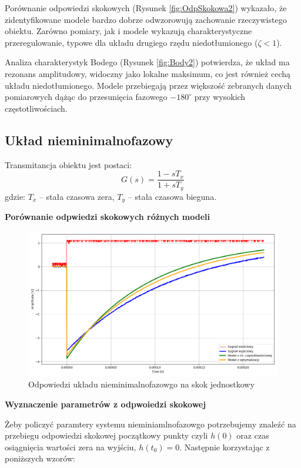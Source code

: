 \documentclass[12pt,a4paper]{article}
\begin{document}
	Porównanie odpowiedzi skokowych (Rysunek \ref{fig:OdpSkokowa2}) wykazało, że zidentyfikowane modele bardzo dobrze odwzorowują zachowanie rzeczywistego obiektu. Zarówno pomiary, jak i modele wykazują charakterystyczne przeregulowanie, typowe dla układu drugiego rzędu niedotłumionego (\(\zeta < 1\)).
	
	Analiza charakterystyk Bodego (Rysunek \ref{fig:Body2}) potwierdza, że układ ma rezonans amplitudowy, widoczny jako lokalne maksimum, co jest również cechą układu niedotłumionego. Modele przebiegają przez większość zebranych danych pomiarowych dążąc do przesunięcia fazowego $-180^\circ$ przy wysokich częstotliwościach.
	
	\subsection{Układ nieminimalnofazowy}
	Transmitancja obiektu jest postaci:
	\begin{equation}
		G(s) = \frac{1-sT_x}{1+sT_y}
	\end{equation}
	gdzie: \(T_x\) – stała czasowa zera, \(T_y\) – stała czasowa bieguna.
	
	\textbf{Porównanie odpwiedzi skokowych różnych modeli}
	
	\begin{figure}[H]
		\centering
		\includegraphics[width=1\linewidth]{zdjecia/odp_skok_nmf.png}
		\caption{Odpowiedzi układu nieminimalnofazowgo na skok jednostkowy}
		\label{fig:skok_uk_nmf}
	\end{figure}
	
	\textbf{Wyznaczenie parametrów z odpwoiedzi skokowej}
	
	Żeby policzyć paramtery systemu nieminiamlnofazowgo potrzebujemy znaleźć na przebiegu odpowiedzi skokowej 
	początkowy punkty czyli $h(0)$ oraz czas osiągnięcia wartości zera na wyjściu, $h(t_0) = 0$. Następnie korzystając z poniższych wzorów:
	
\end{document}
